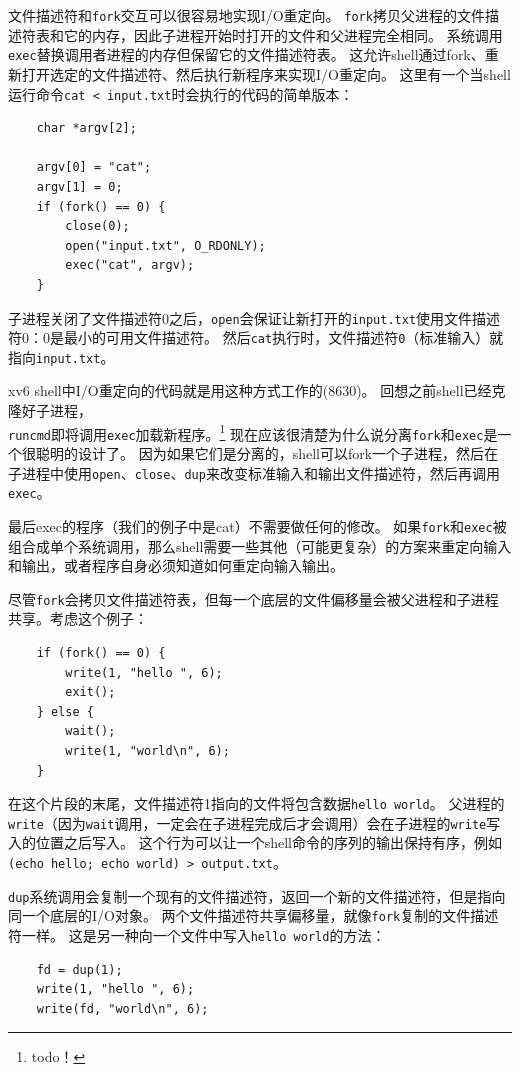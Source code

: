 文件描述符和\texttt{fork}交互可以很容易地实现I/O重定向。
\texttt{fork}拷贝父进程的文件描述符表和它的内存，因此子进程开始时打开的文件和父进程完全相同。
系统调用\texttt{exec}替换调用者进程的内存但保留它的文件描述符表。
这允许shell通过fork、重新打开选定的文件描述符、然后执行新程序来实现I/O重定向。
这里有一个当shell运行命令\texttt{cat < input.txt}时会执行的代码的简单版本：

\begin{lstlisting}
    char *argv[2];

    argv[0] = "cat";
    argv[1] = 0;
    if (fork() == 0) {
        close(0);
        open("input.txt", O_RDONLY);
        exec("cat", argv);
    }
\end{lstlisting}

子进程关闭了文件描述符0之后，\texttt{open}会保证让新打开的\texttt{input.txt}使用文件描述符0：0是最小的可用文件描述符。
然后\texttt{cat}执行时，文件描述符\texttt{0}（标准输入）就指向\texttt{input.txt}。

xv6 shell中I/O重定向的代码就是用这种方式工作的(8630)。
回想之前shell已经克隆好子进程，\\
\texttt{runcmd}即将调用\texttt{exec}加载新程序。\footnote{todo！}
现在应该很清楚为什么说分离\texttt{fork}和\texttt{exec}是一个很聪明的设计了。
因为如果它们是分离的，shell可以fork一个子进程，然后在子进程中使用\texttt{open}、\texttt{close}、\texttt{dup}来改变标准输入和输出文件描述符，然后再调用\texttt{exec}。

最后exec的程序（我们的例子中是cat）不需要做任何的修改。
如果\texttt{fork}和\texttt{exec}被组合成单个系统调用，那么shell需要一些其他（可能更复杂）的方案来重定向输入和输出，或者程序自身必须知道如何重定向输入输出。

尽管\texttt{fork}会拷贝文件描述符表，但每一个底层的文件偏移量会被父进程和子进程共享。考虑这个例子：
\begin{lstlisting}
    if (fork() == 0) {
        write(1, "hello ", 6);
        exit();
    } else {
        wait();
        write(1, "world\n", 6);
    }
\end{lstlisting}
在这个片段的末尾，文件描述符1指向的文件将包含数据\texttt{hello world}。
父进程的\texttt{write}（因为\texttt{wait}调用，一定会在子进程完成后才会调用）会在子进程的\texttt{write}写入的位置之后写入。
这个行为可以让一个shell命令的序列的输出保持有序，例如\texttt{(echo hello; echo world) > output.txt}。

\texttt{dup}系统调用会复制一个现有的文件描述符，返回一个新的文件描述符，但是指向同一个底层的I/O对象。
两个文件描述符共享偏移量，就像\texttt{fork}复制的文件描述符一样。
这是另一种向一个文件中写入\texttt{hello world}的方法：
\begin{lstlisting}
    fd = dup(1);
    write(1, "hello ", 6);
    write(fd, "world\n", 6);
\end{lstlisting}

